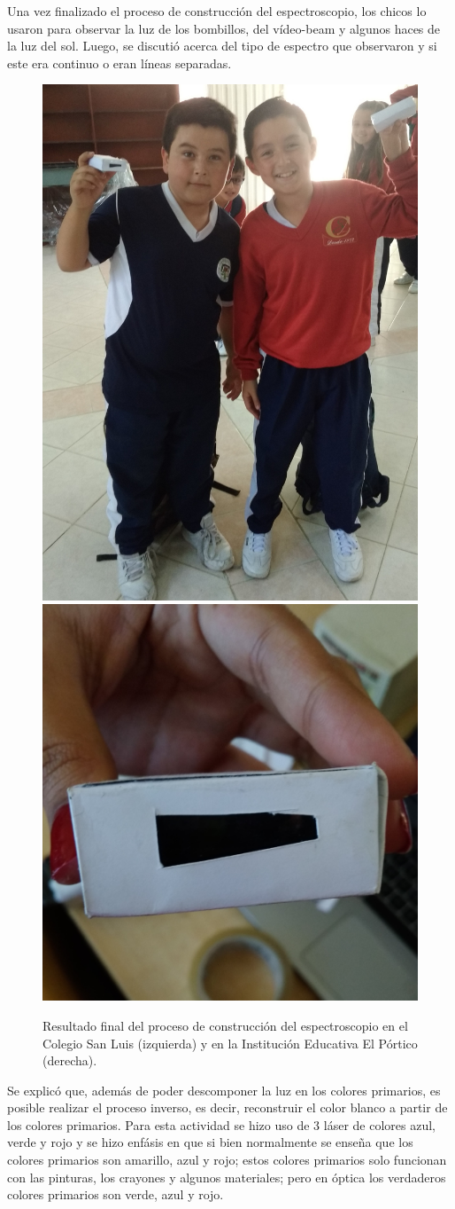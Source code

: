 \documentclass[a4paper,10pt]{article}
\begin{document}
\noindent Una vez finalizado el proceso de construcción del espectroscopio, los chicos lo usaron para observar la luz de los bombillos, del vídeo-beam y algunos haces de la luz del sol. Luego, se discutió acerca del tipo de espectro que observaron y si este era continuo o eran líneas separadas.
\begin{figure}[H]
    \centering
    \includegraphics[width = 5.0 cm]{Imagenes/espectrosanluis.jpg}
    \includegraphics[width = 6.5 cm]{Imagenes/espectro.jpg}
    \caption{Resultado final del proceso de construcción del espectroscopio en el Colegio San Luis (izquierda) y en la Institución Educativa El Pórtico (derecha).}
\end{figure}
\noindent Se explicó que, además de poder descomponer la luz en los colores primarios, es posible realizar el proceso inverso, es decir, reconstruir el color blanco a partir de los colores primarios. Para esta actividad se hizo uso de 3 láser de colores azul, verde y rojo y se hizo enfásis en que si bien normalmente se enseña que los colores primarios son amarillo, azul y rojo; estos colores primarios solo funcionan con las pinturas, los crayones y algunos materiales; pero en óptica los verdaderos colores primarios son verde, azul y rojo.
\end{document}
